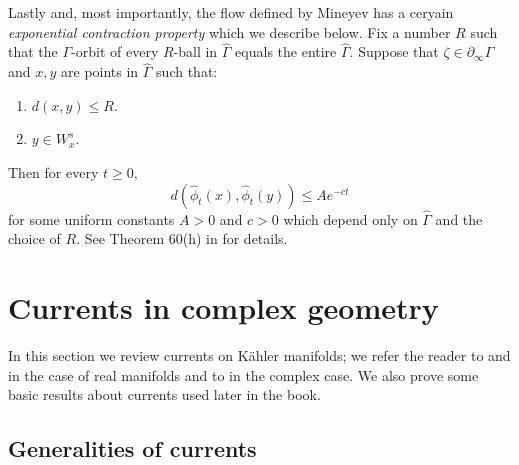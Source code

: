 \documentclass[12pt]{amsbook}%
\theoremstyle{definition}
\theoremstyle{remark}
\numberwithin{section}{chapter}
\numberwithin{subsection}{section}
\numberwithin{figure}{chapter}
\newcommand\bac[1]{{\color{blue} #1} }
\def\<{\langle}
\def\>{\rangle}
\def\Ga{\Gamma}
\def\geo{\partial_\infty}
\def\zhao{\color{red}}
\begin{document}
\medskip
Lastly and, most importantly, the flow defined by Mineyev has a ceryain {\em exponential contraction property} which we describe below. 
Fix a number $R$ such that the $\Ga$-orbit of every $R$-ball in $\widehat\Ga$ equals the entire $\widehat\Ga$. Suppose that 
$\zeta\in\geo \Ga$ and $x, y$ are points in $\widehat\Ga$ such that:

\begin{enumerate}
\item $d(x,y)\le R$.

\item %
$y\in W^s_x$. %

\end{enumerate}

Then for every $t\ge 0$,
\begin{equation}\label{eq:contract}
d(\hat\phi_t(x), \hat\phi_t(y))\le Ae^{-ct}
\end{equation}
 for some uniform constants $A>0$ and $c>0$ which depend only on $\widehat\Ga$ and the choice of $R$. See Theorem 
 60(h) in \cite{Mineyev2005} for details. 
 

  





\chapter{Currents in complex geometry}\label{sec:currents}


In this section we review currents on  K\"ahler manifolds; we refer the reader to \cite[Chapter 4]{morgan} and \cite[Chapter III]{deRham} 
in the case of real manifolds and to \cite[I.2 and III.2]{demailly} in the complex case. We also 
 prove some basic results about currents used later in the book. 

\section{Generalities of currents}\label{sec:Generalities of currents}
\end{document}
